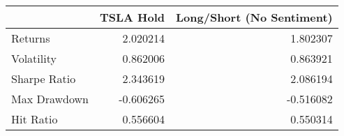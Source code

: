 \begin{tabular}{lrr}
\toprule
{} &  TSLA Hold &  Long/Short (No Sentiment) \\
\midrule
Returns      &   2.020214 &                   1.802307 \\
Volatility   &   0.862006 &                   0.863921 \\
Sharpe Ratio &   2.343619 &                   2.086194 \\
Max Drawdown &  -0.606265 &                  -0.516082 \\
Hit Ratio    &   0.556604 &                   0.550314 \\
\bottomrule
\end{tabular}
